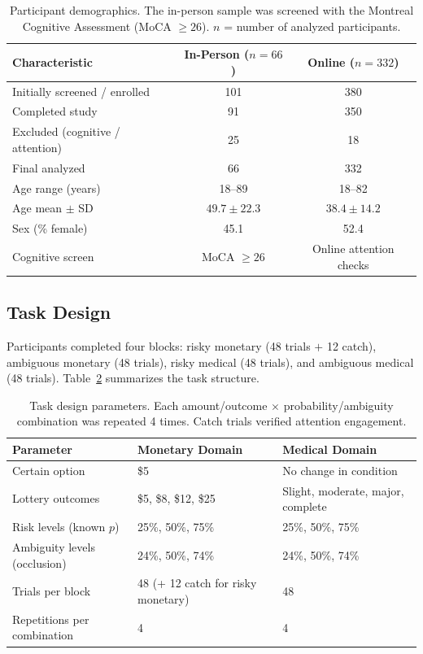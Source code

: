 \documentclass[11pt]{article}
\begin{document}
\begin{table}[H]
\centering
\caption{Participant demographics. The in-person sample was screened with the Montreal Cognitive Assessment (MoCA $\geq 26$). $n$ = number of analyzed participants.}
\label{tab:demographics}
\begin{tabular}{lcc}
\toprule
\textbf{Characteristic} & \textbf{In-Person ($n = 66$)} & \textbf{Online ($n = 332$)} \\
\midrule
Initially screened / enrolled & 101 & 380 \\
Completed study & 91 & 350 \\
Excluded (cognitive / attention) & 25 & 18 \\
Final analyzed & 66 & 332 \\
Age range (years) & 18--89 & 18--82 \\
Age mean $\pm$ SD & $49.7 \pm 22.3$ & $38.4 \pm 14.2$ \\
Sex (\% female) & 45.1 & 52.4 \\
Cognitive screen & MoCA $\geq 26$ & Online attention checks \\
\bottomrule
\end{tabular}
\end{table}

\subsection{Task Design}

Participants completed four blocks: risky monetary (48 trials $+$ 12 catch), ambiguous monetary (48 trials), risky medical (48 trials), and ambiguous medical (48 trials). Table~\ref{tab:task_design} summarizes the task structure.

\begin{table}[H]
\centering
\caption{Task design parameters. Each amount/outcome $\times$ probability/ambiguity combination was repeated 4 times. Catch trials verified attention engagement.}
\label{tab:task_design}
\begin{tabular}{lll}
\toprule
\textbf{Parameter} & \textbf{Monetary Domain} & \textbf{Medical Domain} \\
\midrule
Certain option & \$5 & No change in condition \\
Lottery outcomes & \$5, \$8, \$12, \$25 & Slight, moderate, major, complete \\
Risk levels (known $p$) & 25\%, 50\%, 75\% & 25\%, 50\%, 75\% \\
Ambiguity levels (occlusion) & 24\%, 50\%, 74\% & 24\%, 50\%, 74\% \\
Trials per block & 48 (+ 12 catch for risky monetary) & 48 \\
Repetitions per combination & 4 & 4 \\
\bottomrule
\end{tabular}
\end{table}
\end{document}
